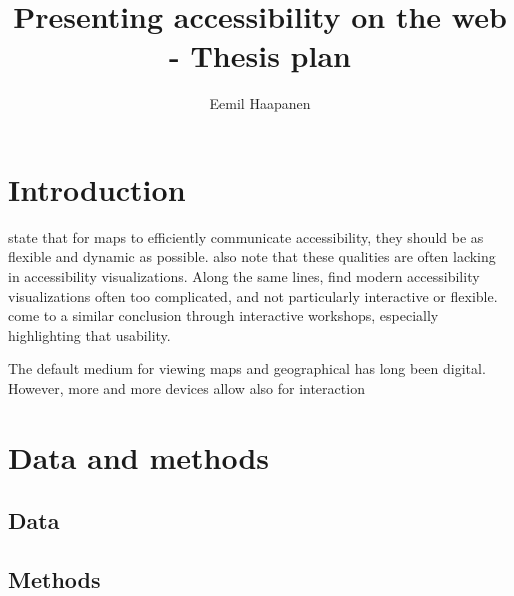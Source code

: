 \documentclass{article}
\title{Presenting accessibility on the web - Thesis plan}
\author{Eemil Haapanen}
\begin{document}
\maketitle

\section{Introduction}


\textcite{but2018} state that for maps to efficiently communicate accessibility,
they should be as flexible and dynamic as possible.
\citeauthor{but2018} also note that these qualities are often lacking in accessibility visualizations.
Along the same lines, \textcite{paj2021} find modern accessibility visualizations often too complicated,
and not particularly interactive or flexible.
\textcite{te2014} come to a similar conclusion through interactive workshops,
especially highlighting that usability.  %


The default medium for viewing maps and geographical has long been digital.  %
However, more and more devices allow also for interaction \parencite{mei2019}


\section{Data and methods}

\subsection{Data}
\subsection{Methods}

\printbibliography
\end{document}
